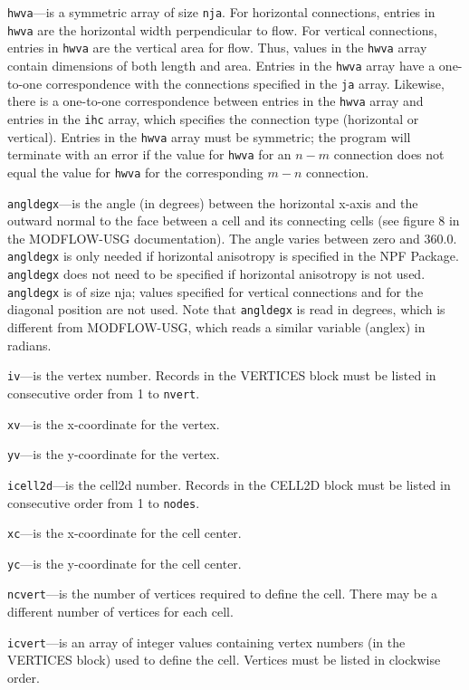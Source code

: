 \item \texttt{hwva}---is a symmetric array of size \texttt{nja}.  For horizontal connections, entries in \texttt{hwva} are the horizontal width perpendicular to flow.  For vertical connections, entries in \texttt{hwva} are the vertical area for flow.  Thus, values in the \texttt{hwva} array contain dimensions of both length and area.  Entries in the \texttt{hwva} array have a one-to-one correspondence with the connections specified in the \texttt{ja} array.  Likewise, there is a one-to-one correspondence between entries in the \texttt{hwva} array and entries in the \texttt{ihc} array, which specifies the connection type (horizontal or vertical).  Entries in the \texttt{hwva} array must be symmetric; the program will terminate with an error if the value for \texttt{hwva} for an $n-m$ connection does not equal the value for \texttt{hwva} for the corresponding $m-n$ connection.

\item \texttt{angldegx}---is the angle (in degrees) between the horizontal x-axis and the outward normal to the face between a cell and its connecting cells (see figure 8 in the MODFLOW-USG documentation). The angle varies between zero and 360.0.  \texttt{angldegx} is only needed if horizontal anisotropy is specified in the NPF Package.  \texttt{angldegx} does not need to be specified if horizontal anisotropy is not used.  \texttt{angldegx} is of size nja; values specified for vertical connections and for the diagonal position are not used.  Note that \texttt{angldegx} is read in degrees, which is different from MODFLOW-USG, which reads a similar variable (anglex) in radians.

\item \texttt{iv}---is the vertex number.  Records in the VERTICES block must be listed in consecutive order from 1 to \texttt{nvert}.

\item \texttt{xv}---is the x-coordinate for the vertex.

\item \texttt{yv}---is the y-coordinate for the vertex.

\item \texttt{icell2d}---is the cell2d number.  Records in the CELL2D block must be listed in consecutive order from 1 to \texttt{nodes}.

\item \texttt{xc}---is the x-coordinate for the cell center.

\item \texttt{yc}---is the y-coordinate for the cell center.

\item \texttt{ncvert}---is the number of vertices required to define the cell.  There may be a different number of vertices for each cell.

\item \texttt{icvert}---is an array of integer values containing vertex numbers (in the VERTICES block) used to define the cell.  Vertices must be listed in clockwise order.


